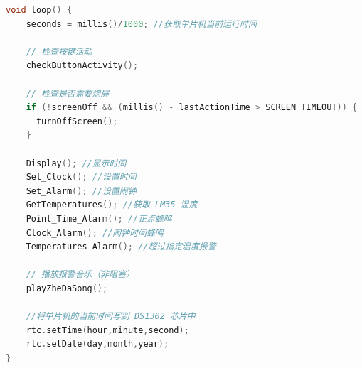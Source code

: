 \documentclass[10.5pt]{config}
\begin{document}
\begin{lstlisting}[language=C++, caption="main.cpp"]
void loop() { 
    seconds = millis()/1000; //获取单片机当前运行时间
    
    // 检查按键活动
    checkButtonActivity();
    
    // 检查是否需要熄屏
    if (!screenOff && (millis() - lastActionTime > SCREEN_TIMEOUT)) {
      turnOffScreen();
    }

    Display(); //显示时间    
    Set_Clock(); //设置时间
    Set_Alarm(); //设置闹钟
    GetTemperatures(); //获取 LM35 温度
    Point_Time_Alarm(); //正点蜂鸣
    Clock_Alarm(); //闹钟时间蜂鸣
    Temperatures_Alarm(); //超过指定温度报警
    
    // 播放报警音乐（非阻塞）
    playZheDaSong();
    
    //将单片机的当前时间写到 DS1302 芯片中
    rtc.setTime(hour,minute,second);
    rtc.setDate(day,month,year);
}

\end{lstlisting}
\end{document}
